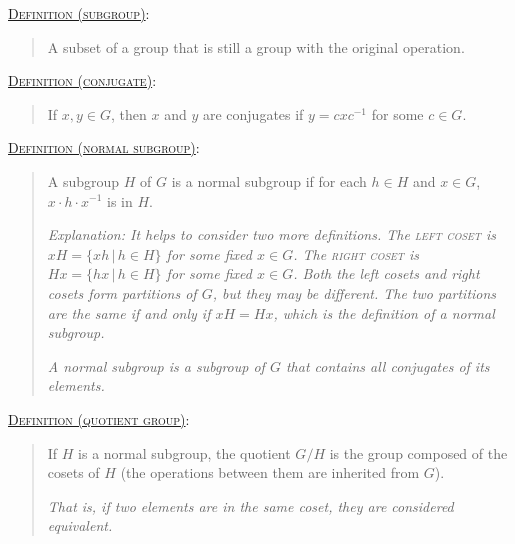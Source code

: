 \documentclass[letterpaper, 12pt]{article}
\newcommand{\defn}[2]{\textsc{\underline{Definition (#1)}:}\begin{quote} #2\end{quote}}
\begin{document}
\begin{enumerate}[resume]
            \defn{subgroup}{A subset of a group that is still a group with the original operation.}

            \defn{conjugate}{If $x,y\in G$, then $x$ and $y$ are conjugates if $y=cxc^{-1}$ for some $c\in G$.}

            \defn{normal subgroup}{A subgroup $H$ of $G$ is a normal subgroup if for each $h\in H$ and $x\in G$, $x\cdot h\cdot x^{-1}$ is in $H$.

            \textit{Explanation: It helps to consider two more definitions. The \textsc{left coset} is $xH = \{xh\,|\,h\in H\}$ for some fixed $x\in G$. The \textsc{right coset} is $Hx = \{hx\,|\,h\in H\}$ for some fixed $x\in G$. Both the left cosets and right cosets form partitions of $G$, but they may be different. The two partitions are the same if and only if $xH = Hx$, which is the definition of a normal subgroup.}

            \textit{A normal subgroup is a subgroup of $G$ that contains all conjugates of its elements.}}

            \defn{quotient group}{If $H$ is a normal subgroup, the quotient $G/H$ is the group composed of the cosets of $H$ (the operations between them are inherited from $G$).

            \textit{That is, if two elements are in the same coset, they are considered equivalent.}}
        \end{enumerate}
\end{document}
